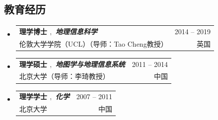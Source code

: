 \documentclass[A4,11pt]{article}
\makeatletter
\newcommand{\CVSubheading}[4]{
  \vspace{-2pt}\item
    \begin{tabular*}{0.97\textwidth}[t]{l@{\extracolsep{\fill}}r}
      \textbf{#1} & #2 \\
      \small#3 & \small #4 \\
    \end{tabular*}\vspace{-7pt}
}
\newcommand{\CVSubHeadingListStart}{\begin{itemize}[leftmargin=0.5cm, label={}]}
\newcommand{\CVSubHeadingListEnd}{\end{itemize}}
\makeatother
\begin{document}
\begin{CJK*}{UTF8}{gbsn}

\section{教育经历}
  \CVSubHeadingListStart
    \CVSubheading
      {{\textbf{理学博士}  $,$ \emph{\small{地理信息科学}}}}{2014 -- 2019}
      {伦敦大学学院（UCL）（导师：Tao Cheng教授）}{英国}
    \CVSubheading
      {{理学硕士  $,$ \emph{\small{地图学与地理信息系统}}}}{2011 -- 2014}
      {北京大学（导师：李琦教授）}{中国}
    \CVSubheading
      {{理学学士  $,$ \emph{\small{化学}}}}{2007 -- 2011}
      {北京大学}{中国}
  \CVSubHeadingListEnd


\end{CJK*}
\end{document}
